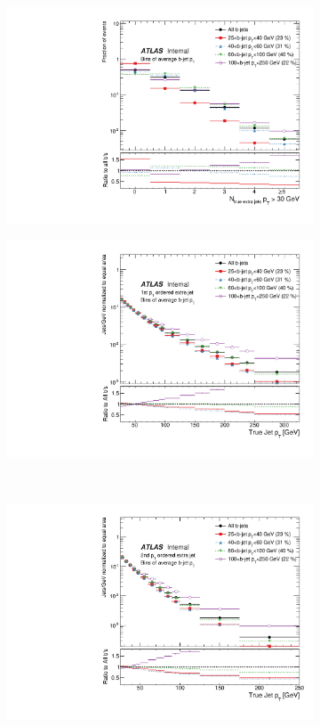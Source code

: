 \begin{figure}
\centering
\begin{subfigure}[]{0.45\textwidth}
\includegraphics[width=\textwidth]{fig/TruthNotReco/BJetNJets30.pdf}
\end{subfigure}
\begin{subfigure}[]{0.45\textwidth}
\includegraphics[width=\textwidth]{fig/TruthNotReco/BJetPtJet0.pdf}
\end{subfigure}
\\
\begin{subfigure}[]{0.45\textwidth}
\includegraphics[width=\textwidth]{fig/TruthNotReco/BJetPtJet1.pdf}

\end{subfigure}
\end{figure}
